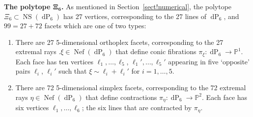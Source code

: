 \documentclass[10pt,a4paper]{amsart}
\numberwithin{equation}{section}
\theoremstyle{definition}
\newcommand{\PP}{\mathbb{P}}
\DeclareMathOperator{\NS}{NS}
\DeclareMathOperator{\dP}{dP}
\DeclareMathOperator{\Nef}{Nef}
\begin{document}
{\bf The polytope $\boldsymbol{\Xi_6}$.}
As mentioned in Section~\ref{sect!numerical}, the polytope $\Xi_6\subset \NS(\dP_6)$ has 27 vertices, corresponding to the 27 lines of $\dP_6$, and $99=27+72$ facets which are one of two types:
\begin{enumerate}\itemsep=0pt
\item[(1)] There are 27 5-dimensional orthoplex facets, corresponding to the 27 extremal rays $.\xi\in \Nef(\dP_6)$ that define conic fibrations $\pi_\xi\colon \dP_6\to \PP^1$. Each face has ten vertices $\ell_1,\ldots,\ell_5$, $\ell_1',\ldots,\ell_5'$ appearing in five `opposite' pairs $\ell_i$, $\ell_i'$ such that $\xi\sim \ell_i + \ell_i'$ for $i=1,\ldots,5$.
\item[(2)] There are 72 5-dimensional simplex facets, corresponding to the 72 extremal rays $\eta\in \Nef(\dP_6)$ that define contractions $\pi_\eta\colon \dP_6\to \PP^2$. Each face has six vertices $\ell_1,\ldots,\ell_6$; the six lines that are contracted by $\pi_\eta$.
\end{enumerate}
\end{document}

